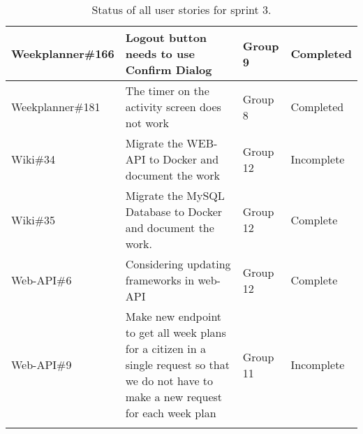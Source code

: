 \begin{longtable}{|p{2.9cm}|p{7cm}|p{2cm}|p{2cm}|}
    Weekplanner\#166 & Logout button needs to use Confirm Dialog                                                                                                                                             & Group 9        & Completed     \\ \hline
    Weekplanner\#181 & The timer on the activity screen does not work                                                                                                                                         & Group 8       & Completed    \\ \hline
    Wiki\#34         & Migrate the WEB-API to Docker and document the work                                                                                                                                     & Group 12     & Incomplete    \\ \hline
    Wiki\#35         & Migrate the MySQL Database to Docker and document the work.                                                                                                                            & Group 12      & Complete   \\ \hline
    Web-API\#6      & Considering updating frameworks in web-API                                                                                                                                            & Group 12        & Complete    \\ \hline
    Web-API\#9      & Make new endpoint to get all week plans for a citizen in a single request so that we do not have to make a new request for each week plan                                                & Group 11        & Incomplete    \\ \hline
    \caption{Status of all user stories for sprint 3.}\label{table:sprint-3-review}
\end{longtable}


